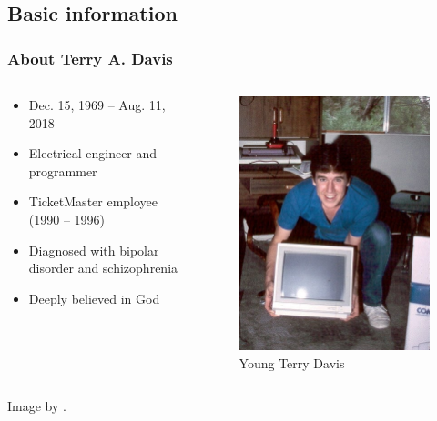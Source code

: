 \documentclass{beamer}
\begin{document}
	\subsection{Basic information}
	\begin{frame}
		\frametitle{About Terry A. Davis}
		\begin{columns}
			\begin{column}{0.6\textwidth}
				\begin{itemize}
					\item Dec. 15, 1969 – Aug. 11, 2018

					\item Electrical engineer and programmer

					\item TicketMaster employee (1990 – 1996)

					\item Diagnosed with bipolar disorder and schizophrenia

					\item Deeply believed in God
				\end{itemize}
			\end{column}
			\begin{column}{0.25\textwidth}
				\begin{figure}
					\centering
					\includegraphics[width=\linewidth]{images/terry_1.jpg}
					\caption{Young Terry Davis}
					\label{fig:terry-young}
				\end{figure}
			\end{column}
		\end{columns}
		Image by \cite{davis_terry_2017}.
	\end{frame}
\end{document}
